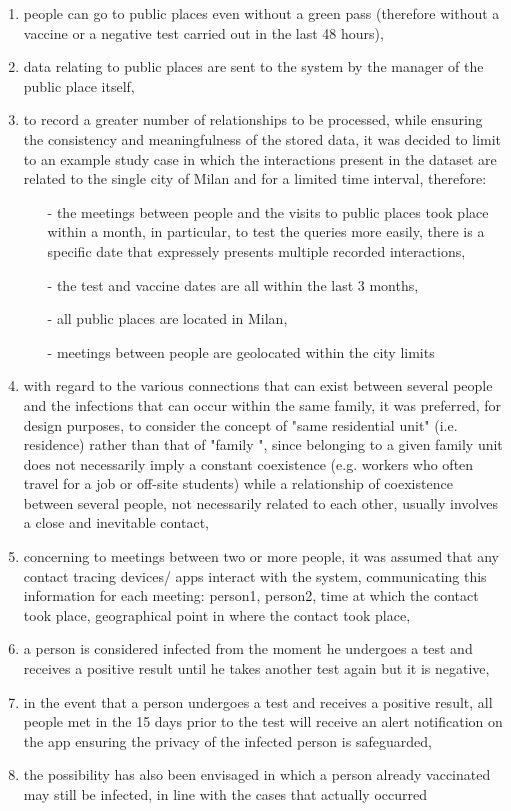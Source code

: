 \documentclass[a4paper,12pt]{article}
\begin{document}
  \begin{enumerate}[noitemsep]
    \item people can go to public places even without a green pass (therefore without a vaccine or a negative test carried out in the last 48 hours),
    \item data relating to public places are sent to the system by the manager of the public place itself,
    \item to record a greater number of relationships to be processed, while ensuring the consistency and meaningfulness of the stored data, it was decided to limit to an example study case in which the interactions present in the dataset are related to the single city of Milan and for a limited time interval, therefore:
  \begin{itemize}[noitemsep]
    \item[-] the meetings between people and the visits to public places took place within a month, in particular, to test the queries more easily, there is a specific date that expressely presents multiple recorded interactions,
    \item[-] the test and vaccine dates are all within the last 3 months,
    \item[-] all public places are located in Milan,
    \item[-] meetings between people are geolocated within the city limits
  \end{itemize}
    \item with regard to the various connections that can exist between several people and the infections that can occur within the same family, it was preferred, for design purposes, to consider the concept of "same residential unit" (i.e. residence) rather than that of "family ", since belonging to a given family unit does not necessarily imply a constant coexistence (e.g. workers who often travel for a job or off-site students) while a relationship of coexistence between several people, not necessarily related to each other, usually involves a close and inevitable contact,
    \item concerning to meetings between two or more people, it was assumed that any contact tracing devices/ apps interact with the system, communicating this information for each meeting: person1, person2, time at which the contact took place, geographical point in where the contact took place,
    \item a person is considered infected from the moment he undergoes a test and receives a positive result until he takes another test again but it is negative,
    \item in the event that a person undergoes a test and receives a positive result, all people met in the 15 days prior to the test will receive an alert notification on the app ensuring the privacy of the infected person is safeguarded,
    \item the possibility has also been envisaged in which a person already vaccinated may still be infected, in line with the cases that actually occurred
  \end{enumerate}
\clearpage
\end{document}
